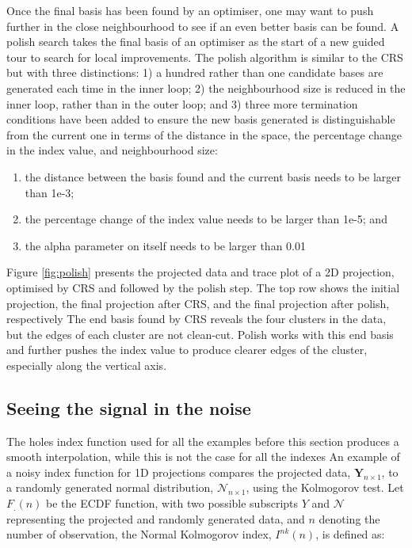 Once the final basis has been found by an optimiser, one may want to
push further in the close neighbourhood to see if an even better basis
can be found. A polish search takes the final basis of an optimiser as
the start of a new guided tour to search for local improvements. The
polish algorithm is similar to the CRS but with three distinctions: 1) a
hundred rather than one candidate bases are generated each time in the
inner loop; 2) the neighbourhood size is reduced in the inner loop,
rather than in the outer loop; and 3) three more termination conditions
have been added to ensure the new basis generated is distinguishable
from the current one in terms of the distance in the space, the
percentage change in the index value, and neighbourhood size:

\begin{enumerate}
\def\labelenumi{\arabic{enumi})}
\tightlist
\item
  the distance between the basis found and the current basis needs to be
  larger than 1e-3;
\item
  the percentage change of the index value needs to be larger than 1e-5;
  and
\item
  the alpha parameter on itself needs to be larger than 0.01
\end{enumerate}

Figure \ref{fig:polish} presents the projected data and trace plot of a
2D projection, optimised by CRS and followed by the polish step. The top
row shows the initial projection, the final projection after CRS, and
the final projection after polish, respectively The end basis found by
CRS reveals the four clusters in the data, but the edges of each cluster
are not clean-cut. Polish works with this end basis and further pushes
the index value to produce clearer edges of the cluster, especially
along the vertical axis.

\hypertarget{seeing-the-signal-in-the-noise}{%
\subsection{Seeing the signal in the
noise}\label{seeing-the-signal-in-the-noise}}

The holes index function used for all the examples before this section
produces a smooth interpolation, while this is not the case for all the
indexes An example of a noisy index function for 1D projections compares
the projected data, \(\mathbf{Y}_{n \times 1}\), to a randomly generated
normal distribution, \(\mathcal{N}_{n \times 1}\), using the Kolmogorov
test. Let \(F_{.}(n)\) be the ECDF function, with two possible
subscripts \(Y\) and \(\mathcal{N}\) representing the projected and
randomly generated data, and \(n\) denoting the number of observation,
the Normal Kolmogorov index, \(I^{nk}(n)\), is defined as:

